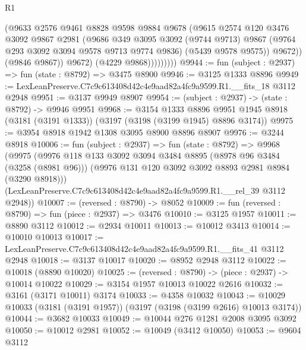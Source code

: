 \begin{lexlean}{R1}
\begin{coremodule}
                        (@9633
                          @2576
                          @9461
                          @8828
                          @9598
                          @9884
                          @9678
                          (@9615
                            @2574
                            @120
                            @3476
                            @3092
                            @9867
                            @2981
                            (@9686
                              @349
                              @3095
                              @3092
                              (@9744 @9713)
                              @9867
                              (@9764 @293 @3092 @3094 @9578 @9713 @9774 @9836)
                              (@5439 @9578 @9575))
                            @9672))
                        (@9846 @9867))
                      @9672)
                    (@4229 @9868)))))))))
@9944 := fun (subject : @2937) => fun (state : @8792) => @3475 @8900
@9946 := @3125 @1333 @8896
@9949 := LexLeanPreserve.C7c9c613408d42c4e9aad82a4fc9a9599.R1.__fits_18 @3112 @2948
@9951 := @3137 @9949 @8907
@9954 := (subject : @2937) -> (state : @8792) -> @9946 @9951
@9968 := @3154
    @1333
    @8896
    @9951
    @1945
    @8918
    (@3181 (@3191 @1333))
    (@3197 (@3198 (@3199 @1945) @8896 @3174))
@9975 := @3954 @8918 @1942 @1308 @3095 @8900 @8896 @8907
@9976 := @3244 @8918
@10006 := fun (subject : @2937) =>
  fun (state : @8792) =>
  @9968
    (@9975
      (@9976
        @118
        @133
        @3092
        @3094
        @3484
        @8895
        (@8978 @96 @3484 (@3258 (@8981 @96)))
        (@9976 @131 @120 @3092 @3092 @8893 @2981 @8984 (@3290 @8918)))
      (LexLeanPreserve.C7c9c613408d42c4e9aad82a4fc9a9599.R1.__rel_39 @3112 @2948))
@10007 := (reversed : @8790) -> @8052
@10009 := fun (reversed : @8790) => fun (piece : @2937) => @3476
@10010 := @3125 @1957
@10011 := @8890 @3112
@10012 := @2934 @10011
@10013 := @10012 @3413
@10014 := @10010 @10013
@10017 := LexLeanPreserve.C7c9c613408d42c4e9aad82a4fc9a9599.R1.__fits_41 @3112 @2948
@10018 := @3137 @10017
@10020 := @8952 @2948 @3112
@10022 := @10018 (@8890 @10020)
@10025 := (reversed : @8790) -> (piece : @2937) -> @10014 @10022
@10029 := @3154 @1957 @10013 @10022 @2616
@10032 := @3161 (@3171 @10011) @3174
@10033 := @4358 @10032
@10043 := @10029 @10033 (@3181 (@3191 @1957)) (@3197 (@3198 (@3199 @2616) @10013 @3174))
@10044 := @3682 @10033
@10049 := @10044 @276 @1281 @2008 @3095 @3092
@10050 := @10012 @2981
@10052 := @10049 (@3412 @10050)
@10053 := @9604 @3112

\end{coremodule}
\end{lexlean}
